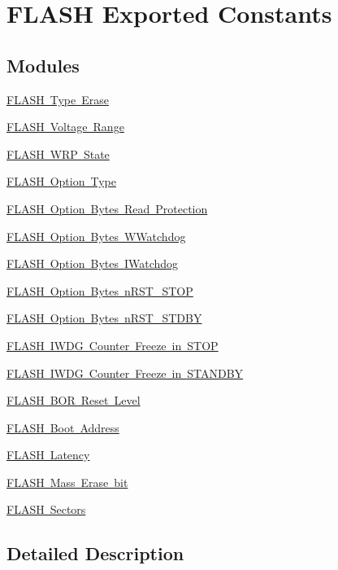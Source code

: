\hypertarget{group___f_l_a_s_h_ex___exported___constants}{}\section{F\+L\+A\+SH Exported Constants}
\label{group___f_l_a_s_h_ex___exported___constants}
\subsection*{Modules}
\begin{DoxyCompactItemize}
\item 
\mbox{\hyperlink{group___f_l_a_s_h_ex___type___erase}{F\+L\+A\+S\+H Type Erase}}
\item 
\mbox{\hyperlink{group___f_l_a_s_h_ex___voltage___range}{F\+L\+A\+S\+H Voltage Range}}
\item 
\mbox{\hyperlink{group___f_l_a_s_h_ex___w_r_p___state}{F\+L\+A\+S\+H W\+R\+P State}}
\item 
\mbox{\hyperlink{group___f_l_a_s_h_ex___option___type}{F\+L\+A\+S\+H Option Type}}
\item 
\mbox{\hyperlink{group___f_l_a_s_h_ex___option___bytes___read___protection}{F\+L\+A\+S\+H Option Bytes Read Protection}}
\item 
\mbox{\hyperlink{group___f_l_a_s_h_ex___option___bytes___w_watchdog}{F\+L\+A\+S\+H Option Bytes W\+Watchdog}}
\item 
\mbox{\hyperlink{group___f_l_a_s_h_ex___option___bytes___i_watchdog}{F\+L\+A\+S\+H Option Bytes I\+Watchdog}}
\item 
\mbox{\hyperlink{group___f_l_a_s_h_ex___option___bytes__n_r_s_t___s_t_o_p}{F\+L\+A\+S\+H Option Bytes n\+R\+S\+T\+\_\+\+S\+T\+OP}}
\item 
\mbox{\hyperlink{group___f_l_a_s_h_ex___option___bytes__n_r_s_t___s_t_d_b_y}{F\+L\+A\+S\+H Option Bytes n\+R\+S\+T\+\_\+\+S\+T\+D\+BY}}
\item 
\mbox{\hyperlink{group___f_l_a_s_h_ex___option___bytes___i_w_d_g___f_r_e_e_z_e___s_t_o_p}{F\+L\+A\+S\+H I\+W\+D\+G Counter Freeze in S\+T\+OP}}
\item 
\mbox{\hyperlink{group___f_l_a_s_h_ex___option___bytes___i_w_d_g___f_r_e_e_z_e___s_a_n_d_b_y}{F\+L\+A\+S\+H I\+W\+D\+G Counter Freeze in S\+T\+A\+N\+D\+BY}}
\item 
\mbox{\hyperlink{group___f_l_a_s_h_ex___b_o_r___reset___level}{F\+L\+A\+S\+H B\+O\+R Reset Level}}
\item 
\mbox{\hyperlink{group___f_l_a_s_h_ex___boot___address}{F\+L\+A\+S\+H Boot Address}}
\item 
\mbox{\hyperlink{group___f_l_a_s_h___latency}{F\+L\+A\+S\+H Latency}}
\item 
\mbox{\hyperlink{group___f_l_a_s_h_ex___mass_erase__bit}{F\+L\+A\+S\+H Mass Erase bit}}
\item 
\mbox{\hyperlink{group___f_l_a_s_h_ex___sectors}{F\+L\+A\+S\+H Sectors}}
\end{DoxyCompactItemize}


\subsection{Detailed Description}
